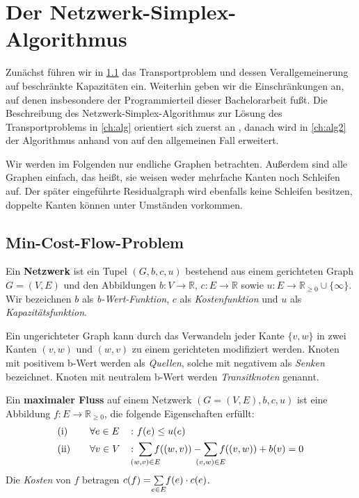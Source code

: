 \chapter{Der Netzwerk-Simplex-Algorithmus}\label{ch:NSA}
Zunächst führen wir in \cref{ch:MCF} das Transportproblem und dessen Verallgemeinerung auf beschränkte Kapazitäten ein. Weiterhin geben wir die Einschränkungen an, auf denen insbesondere der Programmierteil dieser Bachelorarbeit fußt. Die Beschreibung des Netzwerk-Simplex-Algorithmus zur Lösung des Transportproblems in \cref{ch:alg} orientiert sich zuerst an \cite[S. 291\,ff.]{NSAbook}, danach wird in \cref{ch:alg2} der Algorithmus anhand von \cite[S. 353\,ff.]{NSAbook} auf den allgemeinen Fall erweitert.

Wir werden im Folgenden nur endliche Graphen betrachten. Außerdem sind alle Graphen einfach, das heißt, sie weisen weder mehrfache Kanten noch Schleifen auf. Der später eingeführte Residualgraph wird ebenfalls keine Schleifen besitzen, doppelte Kanten können unter Umständen vorkommen.

\section{Min-Cost-Flow-Problem}\label{ch:MCF}
\begin{defn}Ein \textbf{Netzwerk} ist ein Tupel $(G,b,c,u)$ bestehend aus einem gerichteten Graph $G = (V,E)$ und den Abbildungen $b \colon V\rightarrow\mathbb{R}$, $c \colon E\rightarrow\mathbb{R}$ sowie $u \colon E\rightarrow\mathbb{R}_{\geq 0}\cup \{\infty\}$. Wir bezeichnen $b$ als \emph{b-Wert-Funktion}, $c$ als \emph{Kostenfunktion} und $u$ als \emph{Kapazitätsfunktion}.\end{defn}
\begin{anm}Ein ungerichteter Graph kann durch das Verwandeln jeder Kante $\{v,w\}$ in zwei Kanten $(v,w)$ und $(w,v)$ zu einem gerichteten modifiziert werden. Knoten mit positivem b-Wert werden als \emph{Quellen}, solche mit negativem als \emph{Senken} bezeichnet. Knoten mit neutralem b-Wert werden \emph{Transitknoten} genannt.\end{anm}

\begin{defn}\label{DefMaxFlow}Ein \textbf{maximaler Fluss} auf einem Netzwerk $(G=(V,E),b,c,u)$ ist eine Abbildung $f \colon E\rightarrow\mathbb{R}_{\geq 0}$, die folgende Eigenschaften erfüllt:
\begin{alignat}{3}
&\text{(i)}\quad&&\forall e\in E &&\colon f(e)\leq u(e)\nonumber\\
&\text{(ii)}\quad&&\forall v\in V &&\colon \sum_{\mathclap{(w,v)\in E}} f((w,v)) - \sum_{\mathclap{(v,w)\in E}} f((v,w)) + b(v) = 0\label{DefMaxFlowII}
\end{alignat}
Die \emph{Kosten} von $f$ betragen $c(f) = \sum\limits_{\mathclap{e\in E}} f(e)\cdot c(e)$.
\end{defn}

